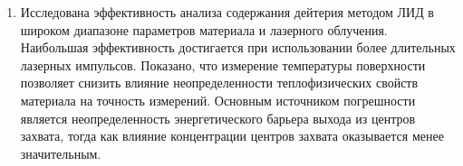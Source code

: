 \begin{enumerate}
  \item Исследована эффективность анализа содержания дейтерия методом ЛИД в широком диапазоне параметров материала и лазерного облучения. Наибольшая эффективность достигается при использовании более длительных лазерных импульсов. Показано, что измерение температуры поверхности позволяет снизить влияние неопределенности теплофизических свойств материала на точность измерений. Основным источником погрешности является неопределенность энергетического барьера выхода из центров захвата, тогда как влияние концентрации центров захвата оказывается менее значительным.    
\end{enumerate}
